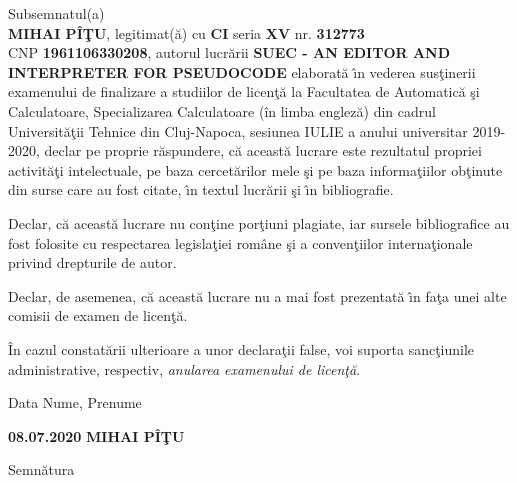 \documentclass[12pt,a4paper,twoside]{report}
\begin{document}
Subsemnatul(a) \\
{\bf MIHAI PÎŢU}, 
legitimat(\u{a}) cu \textbf{CI} seria \textbf{XV} nr. {\bf 312773} \\
CNP {\bf 1961106330208}, autorul lucr\u{a}rii {\bf SUEC - AN EDITOR AND INTERPRETER FOR PSEUDOCODE }
elaborat\u{a} \^{\i}n vederea sus\c{t}inerii examenului de finalizare a studiilor de licen\c{t}\u{a} la Facultatea de Automatic\u{a} \c{s}i Calculatoare, Specializarea Calculatoare (în limba engleză) din cadrul Universit\u{a}\c{t}ii Tehnice din Cluj-Napoca, sesiunea IULIE a anului universitar 2019-2020, declar pe proprie r\u{a}spundere, c\u{a} aceast\u{a} lucrare este rezultatul propriei activit\u{a}\c{t}i intelectuale, pe baza cercet\u{a}rilor mele \c{s}i pe baza informa\c{t}iilor ob\c{t}inute din surse care au fost citate, \^{\i}n textul lucr\u{a}rii \c{s}i \^{\i}n bibliografie.

Declar, c\u{a} aceast\u{a} lucrare nu con\c{t}ine por\c{t}iuni plagiate, iar sursele bibliografice au fost folosite cu 
respectarea legisla\c{t}iei rom\^{a}ne \c{s}i a conven\c{t}iilor interna\c{t}ionale privind drepturile de autor.

Declar, de asemenea, c\u{a} aceast\u{a} lucrare nu a mai fost prezentat\u{a} \^{\i}n fa\c{t}a unei alte comisii de examen de licen\c{t}\u{a}.

\^{I}n cazul constat\u{a}rii ulterioare a unor declara\c{t}ii false, voi suporta sanc\c{t}iunile administrative, respectiv, \emph{anularea examenului de licen\c{t}\u{a}}.

\vspace{1.5cm}

Data \hspace{8cm} Nume, Prenume

\vspace{0.5cm}

\textbf{08.07.2020} \hspace{7cm} \textbf{MIHAI PÎŢU}

\vspace{0.5cm}
\hspace{9.4cm}Semn\u{a}tura

\thispagestyle{empty}

\newpage




% 
\end{document}
